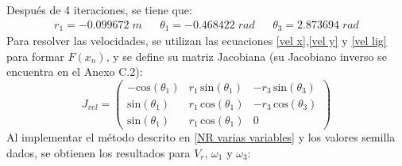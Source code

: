 \documentclass[12pt]{article}
\begin{document}
Después de 4 iteraciones, se tiene que:
\begin{align*}
r_1=-0.099672\;m&&\theta_1=-0.468422\;rad&&\theta_3=2.873694\;rad
\end{align*}
Para resolver las velocidades, se utilizan las ecuaciones \eqref{vel x},\eqref{vel y} y \eqref{vel lig} para formar $F(x_n)$, y se define su matriz Jacobiana (su Jacobiano inverso se encuentra en el Anexo C.2):
\footnotesize
\begin{equation}
    J_{vel}=\left(\begin{array}{ccc}
-\mathrm{cos}\left(\theta_1 \right) & r_1 \,\mathrm{sin}\left(\theta_1 \right) & -r_3 \,\mathrm{sin}\left(\theta_3 \right)\\
\mathrm{sin}\left(\theta_1 \right) & r_1 \,\mathrm{cos}\left(\theta_1 \right) & -r_3 \,\mathrm{cos}\left(\theta_3 \right)\\
\mathrm{sin}\left(\theta_1 \right) & r_1 \,\mathrm{cos}\left(\theta_1 \right) & 0
\end{array}\right)
\label{jacobiano vel}
\end{equation}
\normalsize
Al implementar el método descrito en \eqref{NR varias variables} y los valores semilla dados, se obtienen los resultados para $V_r$, $\omega_1$ y $\omega_3$:
\end{document}
